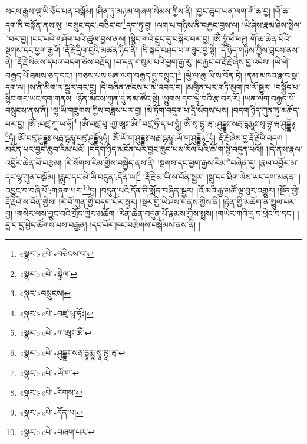སངས་རྒྱས་ལྔ་ཡི་ཅོད་པན་བསྒོམ། །ཤིན་ཏུ་མཉམ་གཞག་སེམས་ཀྱིས་ནི། །བྱང་ཆུབ་ཡན་ལག་གོ་ཆ་བྱ། །གོ་ཆ་དག་ནི་བསྐོན་ནས་སུ། །བསྲུང་དང་:བཅིང་བ་\footnote{«སྣར་»«པེ་»བཅིངས་བ་}དག་ཏུ་བྱ། །ལག་པ་གཉིས་ནི་བརྐྱང་བྱས་ལ། །ཡེ་ཤེས་རྣམ་ཤེས་སྤེལ་\footnote{«སྣར་»«པེ་»སྒྲེལ་}བར་བྱ། །ངང་པའི་གཤོག་པའི་ཚུལ་བྱས་ནས། །སྙིང་གའི་དྲུང་དུ་བསྐོར་བར་བྱ། །ཨོཾ་ཧཱུཾ་ཕེཾ་ཕཊ། གོ་ཆ་ཆེན་པོའི་སྔགས་དང་ཕྱག་རྒྱའོ། །རྡོ་རྗེ་དྲིལ་བུའི་མཚན་ཉིད་ནི། །ཇི་སྐད་བཤད་པ་གཟུང་བྱ་སྟེ། །དེ་ཉིད་གཉིས་ཀྱིས་བླངས་ནས་ནི། །རྡོ་རྗེ་སེམས་དཔའ་བདག་ཅེས་བརྗོད། །བ་དན་གསུམ་པའི་ཕྱག་རྒྱ་རུ། །བརྐྱང་བ་རྡོ་རྗེ་ཞེས་བྱ་འདིས། །ཡི་གེ་བརྒྱད་པོ་ཐམས་ཅད་དང་། །བཅས་པས་ཡན་ལག་བརྒྱད་དུ་བསྲུང་།\footnote{«སྣར་»བསྲུངས།} །ལྕེ་ལ་ཆུ་ཡི་ས་བོན་ཏེ། །ནམ་མཁའ་རྣ་བ་སྣ་དག་ལ། །ས་ནི་མིག་ལ་སྦྱར་བར་བྱ། །དེ་བཞིན་ཚངས་པ་མེ་འབར་བ། །མགྲིན་པར་གཏི་མུག་ཁ་ལོ་སྒྱུར། །བསྐྱོད་པ་སྙིང་གར་ཡང་དག་གནས། །ཉོན་མོངས་ཀུན་དུ་ནམ་ཚོང་སྟེ། །ཕྱུགས་དག་ལྟེ་བའི་རྩ་བར་རོ། །ཡན་ལག་བརྒྱད་པོ་བསྲུངས་ནས་ནི། །ལྷ་ཡི་གཟུགས་ཀྱིས་བཟླས་པར་བྱ། །མེ་ཏོག་བདུག་པ་དྲི་སོགས་པས། །བདག་ཉིད་ཀུན་ཏུ་མཆོད་པར་བྱ། །ཨོཾ་:བཛྲ་ཀཱ་ཡ་ཧོ།\footnote{«སྣར་»«པེ་»བཛྲ་ཡཱ་ཧོཿ།} །ཨོཾ་བཛྲ་པཱ་:ཀྱ་ཨཱཿ་ཨོཾ་\footnote{«སྣར་»«པེ་»ཀ་ཨཱཿ་ཨོཾ་}བཛྲ་ཧྲྀ་ད་ཡ་ཧཱུཾ། ཨོཾ་སྭ་བྷཱ་ཝ་:ཤུདྡྷཿ་སརྦ་དྷརྨཱཿ་སྭ་བྷཱ་ཝ་ཤུདྡྷོ྅\footnote{«སྣར་»«པེ་»ཤུདྡྷཿ་སརྦ་དྷཱརྨཱ་སྭཱ་བྷཱ་ཝ་}ཧཾ། ཨོཾ་བཛྲ་ཤུདྡྷཿ་སརྦ་དྷརྨཱ་བཛྲ་ཤུདྡྷོ྅ཧཾ། ཨོཾ་ཡོ་ག་ཤུདྡྷཿ་སརྦ་དྷརྨཱ་:ཡོ་ག་ཤུདྡྷོ྅\footnote{«སྣར་»«པེ་»ཡོ་ག་}ཧཾ། རྡོ་རྗེ་ཞེས་བྱ་རྡོ་རྗེའི་བདག །མངོན་པར་བྱང་ཆུབ་རིམ་པའོ། །བདག་ཉིད་མངོན་པར་བྱང་ཆུབ་པས་རོལ་པའི་ཆོ་ག་སྟེ་བདུན་པའོ།། །།དེ་ནས་རྣལ་འབྱོར་ཆེན་པོ་བརྩམ། །རི་སོགས་རིམ་གྱིས་བསྐྱེད་ནས་ནི། །སྔགས་དང་ཕྱག་རྒྱས་རིམ་\footnote{«སྣར་»«པེ་»རིགས་}བཞིན་དུ། །རྣལ་འབྱོར་མ་དང་ལྷ་ཀུན་བསྒོམ། །རླུང་དང་མེ་ཡི་བདུན་:དོན་ལ།\footnote{«སྣར་»«པེ་»དོན་པ།} །རྡོ་རྗེ་མ་ཡི་ས་བོན་སྦྱར། །སྒྲ་དང་ཐིག་ལེས་ཡང་དག་མནན། །འབྱུང་བ་བཞི་པོ་:གཞག་པར་\footnote{«སྣར་»«པེ་»བཞག་པར་}བྱ། །བདུན་པའི་དོན་ནི་སྨོན་བཞིན་སྦྱར། །འོ་མའི་རྒྱ་མཚོ་ལྟ་བུར་འགྱུར། །སྔོན་གྱི་རྡོ་རྗེའི་ས་བོན་གྱིས། །རི་བོ་ཀུན་གྱི་བདག་པོར་སྦྱར། །སྔར་གྱི་ཡེ་ཤེས་གནས་ཀྱིས་ནི། །རྟེན་གྱི་མཆོག་ནི་སྤྲུལ་པར་བྱ། །གསེར་ལས་བྱུང་བའི་གྲོང་ཁྱེར་མཆོག །རིན་ཆེན་བདུན་པོ་རྣམས་ཀྱིས་སྤྲས། །གཡེར་ཀའི་དྲ་བ་ཕྲེང་བ་དང་། །དྲ་བ་དྲ་ཕྱེད་ཚོགས་པས་བརྒྱན། །དང་པོར་ཁང་བརྩེགས་བསྒོམས་ནས་ནི། །
